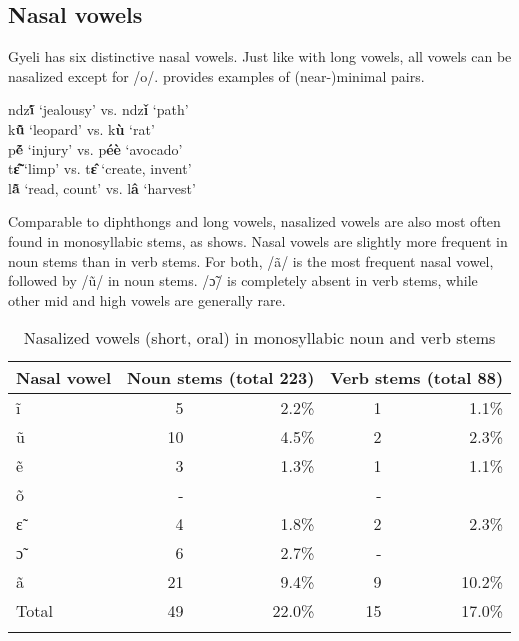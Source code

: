 \subsection{Nasal vowels}
\label{sec:NasalV}

Gyeli has six distinctive nasal vowels. Just like with long vowels, all vowels can be nasalized except for /o/.  provides examples of (near-)minimal pairs.

\ea \label{NasalV}
ndz{\bfseries ĩ́} `jealousy' vs. ndz{\bfseries ǐ} `path' \\
k{\bfseries ũ̂} `leopard' vs. k{\bfseries ù} `rat' \\
p{\bfseries ẽ́} `injury' vs. p{\bfseries éè} `avocado' \\
t{\bfseries ɛ̃̂} `limp' vs. t{\bfseries ɛ̂} `create, invent' \\
l{\bfseries ã̂} `read, count' vs. l{\bfseries â} `harvest' \\
\z

Comparable to diphthongs and long vowels, nasalized vowels are also most often found in monosyllabic stems, as  shows. Nasal vowels are slightly more frequent in noun stems than in verb stems. For both, /ã/ is the most frequent nasal vowel, followed by /ũ/ in noun stems. /ɔ̃/ is completely absent in verb stems, while other mid and high vowels are generally rare.

\begin{table}

\begin{tabularx}{\textwidth}{X rrrr}
\lsptoprule
Nasal vowel& \multicolumn{2}{c}{Noun stems  (total 223)} & \multicolumn{2}{c}{Verb stems  (total 88)} \\  \midrule
ĩ		 & 	5 & 2.2\%	& 	1 & 1.1\% \\
ũ      	& 	10 & 4.5\%	& 	2 & 2.3\% \\
ẽ		& 	3  & 1.3\%    & 	1 & 1.1\% \\
õ	        & 	 - & 	& 	-  \\
ɛ̃             &      4 & 1.8\%   &      2 & 2.3\% \\
ɔ̃            &      6 & 2.7\%  &        - \\
ã            &      21  & 9.4\%   &     9 & 10.2\%  \\  \midrule
Total       &     49  & 22.0\%    &    15 & 17.0\%  \\
\lspbottomrule
\end{tabularx}
\caption{Nasalized vowels (short, oral) in monosyllabic noun and verb stems}
\label{Tab:VNasal}
\end{table}

